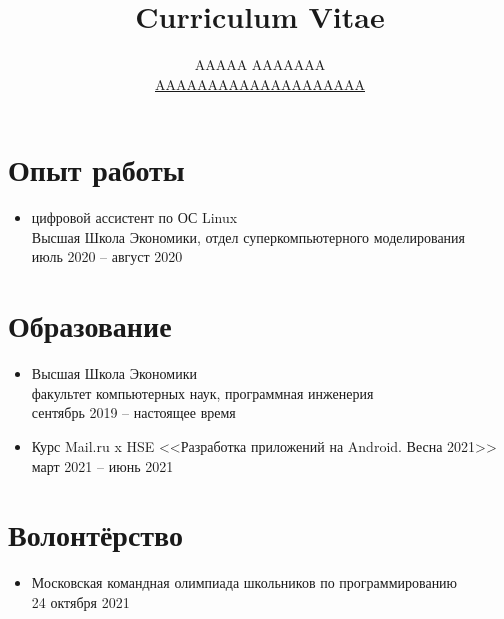 \documentclass[12pt]{article}
\title{Curriculum Vitae}
\author{AAAAA AAAAAAA \\ \href{mailto:AAAAAAAAAAAAAAAAAAAA}{AAAAAAAAAAAAAAAAAAAA}}
\begin{document}
  \maketitle

  \section{Опыт работы}
  \begin{itemize}
    \item цифровой ассистент по ОС Linux \\
      Высшая Школа Экономики, отдел суперкомпьютерного моделирования \\
      июль 2020 -- август 2020

  \end{itemize}

  \section{Образование}
  \begin{itemize}
    \item Высшая Школа Экономики \\
      факультет компьютерных наук, программная инженерия \\
      сентябрь 2019 -- настоящее время

    \item Курс Mail.ru x HSE <<Разработка приложений на Android. Весна 2021>> \\
      март 2021 -- июнь 2021

  \end{itemize}

  \section{Волонтёрство}
  \begin{itemize}
    \item Московская командная олимпиада школьников по программированию \\
      24 октября 2021

  \end{itemize}
\end{document}
